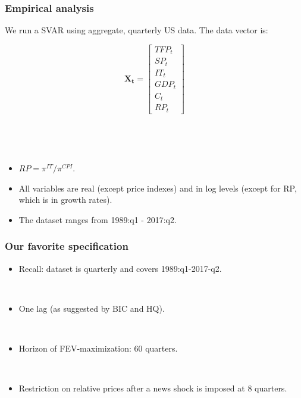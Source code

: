 \documentclass{beamer}
\begin{document}
\begin{frame}
	\frametitle{Empirical analysis}

	We run a SVAR using aggregate, quarterly US data. The data vector is:
	
	\begin{equation}
	\mathbf{X_t} = 
	\begin{bmatrix}
    TFP_t      \\
 
   SP_t   \\
   
   IT_t \\
   
   GDP_t \\
   
   C_t \\
   
   RP_t
\end{bmatrix}
	\end{equation}
	


\

\

\begin{itemize}
\item $RP = \pi^{IT}/\pi^{CPI}$. 
\item All variables are real (except price indexes) and in log levels (except for RP, which is in growth rates). 
\item The dataset ranges from 1989:q1 - 2017:q2.
\end{itemize}	
	
\end{frame}




\begin{frame}
	\frametitle{Our favorite specification}
	
	\begin{itemize}
	\item Recall: dataset is quarterly and covers 1989:q1-2017-q2.
	
	\
	
	\item One lag (as suggested by BIC and HQ).
	
	\
	
	\item Horizon of FEV-maximization: 60 quarters.
	
	\
	
	\item Restriction on relative prices after a news shock is imposed at 8 quarters.
	
	\end{itemize}


	
	
\end{frame}
\end{document}
